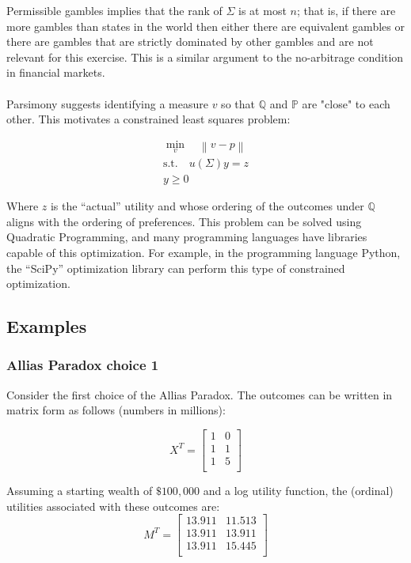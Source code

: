\documentclass{article}
\newcommand{\norm}[1]{\left\lVert#1\right\rVert}
\begin{document}
Permissible gambles implies that the rank of \(\Sigma\) is at most \(n\); that is, if there are more gambles than states in the world then either there are equivalent gambles or there are gambles that are strictly dominated by other gambles and are not relevant for this exercise.  This is a similar argument to the no-arbitrage condition in financial markets.  
\\
\\
Parsimony suggests identifying a measure \(v\) so that \(\mathbb{Q}\) and \(\mathbb{P}\) are "close" to each other.  This motivates a constrained least squares problem:


\begin{equation}
\begin{aligned}
\min_v \quad \norm{v-p} \\
\textrm{s.t.}\quad u(\Sigma) y = z\\
y \geq 0
\end{aligned}
\end{equation}

Where \(z\) is the ``actual'' utility and whose ordering of the outcomes under \(\mathbb{Q}\) aligns with the ordering of preferences.  This problem can be solved using Quadratic Programming, and many programming languages have libraries capable of this optimization. For example, in the programming language Python, the ``SciPy'' optimization library can perform this type of constrained optimization.

\subsection{Examples}

\subsubsection{Allias Paradox choice 1}
Consider the first choice of the Allias Paradox.  The outcomes can be written in matrix form as follows (numbers in millions):

\[X^T=\begin{bmatrix}
	1 & 0  \\
	1 & 1  \\
	1 & 5  \\
\end{bmatrix}\]

Assuming a starting wealth of \(\$100,000\) and a log utility function, the (ordinal) utilities associated with these outcomes are:
\[M^T=\begin{bmatrix}
	13.911 & 11.513  \\
	13.911 & 13.911  \\
	13.911 & 15.445  \\
\end{bmatrix}\]
\end{document}
